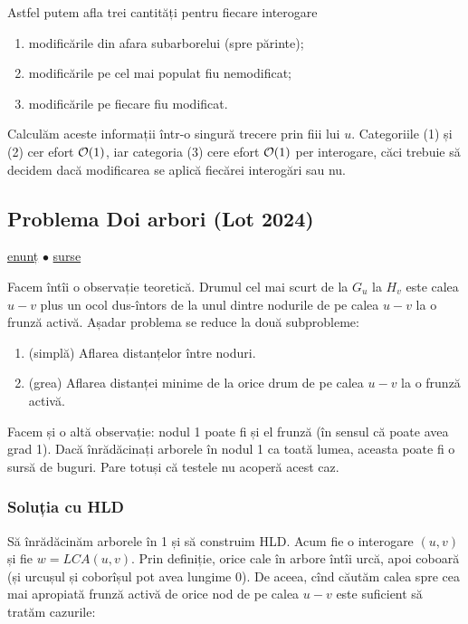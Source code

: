 \documentclass[../main.tex]{subfiles}
\begin{document}
Astfel putem afla trei cantități pentru fiecare interogare

\begin{enumerate}
  \item modificările din afara subarborelui (spre părinte);
  \item modificările pe cel mai populat fiu nemodificat;
  \item modificările pe fiecare fiu modificat.
\end{enumerate}

Calculăm aceste informații într-o singură trecere prin fiii lui $u$. Categoriile (1) și (2) cer efort $\mathcal{O}(1)$, iar categoria (3) cere efort $\mathcal{O}(1)$ per interogare, căci trebuie să decidem dacă modificarea se aplică fiecărei interogări sau nu.

\subsection{Problema Doi arbori (Lot 2024)}
\label{problem:doi-arbori}

\href{https://kilonova.ro/problems/2799}{enunț}
$\bullet$
\hyperref[code:doi-arbori]{surse}

Facem întîi o observație teoretică. Drumul cel mai scurt de la $G_u$ la $H_v$ este calea $u-v$ plus un ocol dus-întors de la unul dintre nodurile de pe calea $u-v$ la o frunză activă. Așadar problema se reduce la două subprobleme:

\begin{enumerate}
  \item (simplă) Aflarea distanțelor între noduri.
  \item (grea) Aflarea distanței minime de la orice drum de pe calea $u-v$ la o frunză activă.
\end{enumerate}

Facem și o altă observație: nodul 1 poate fi și el frunză (în sensul că poate avea grad 1). Dacă înrădăcinați arborele în nodul 1 ca toată lumea, aceasta poate fi o sursă de buguri. Pare totuși că testele nu acoperă acest caz.

\subsubsection*{Soluția cu HLD}

Să înrădăcinăm arborele în 1 și să construim HLD. Acum fie o interogare $(u,v)$ și fie $w=LCA(u,v)$. Prin definiție, orice cale în arbore întîi urcă, apoi coboară (și urcușul și coborîșul pot avea lungime 0). De aceea, cînd căutăm calea spre cea mai apropiată frunză activă de orice nod de pe calea $u-v$ este suficient să tratăm cazurile:
\end{document}
